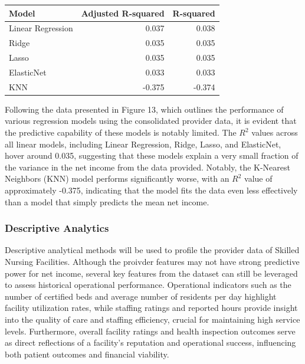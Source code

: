 \documentclass{article}
\theoremstyle{mytheoremstyle}
\theoremstyle{mytheoremstyle}
\theoremstyle{myproblemstyle}
\begin{document}
\begin{table}[ht]
\centering
\begin{tabular}{@{}lrr@{}}
\toprule
Model            & \multicolumn{1}{c}{Adjusted R-squared} & \multicolumn{1}{c}{R-squared} \\ 
\midrule
Linear Regression & 0.037 & 0.038\\
Ridge             & 0.035 & 0.035\\
Lasso             & 0.035 & 0.035\\
ElasticNet        & 0.033 & 0.033\\
KNN               & -0.375 & -0.374\\
\bottomrule
\end{tabular}
\label{tab:model_performance robust}
\end{table}

Following the data presented in Figure 13, which outlines the performance of various regression models using the consolidated provider data, it is evident that the predictive capability of these models is notably limited. The $R^2$ values across all linear models, including Linear Regression, Ridge, Lasso, and ElasticNet, hover around 0.035, suggesting that these models explain a very small fraction of the variance in the net income from the data provided. Notably, the K-Nearest Neighbors (KNN) model performs significantly worse, with an $R^2$ value of approximately -0.375, indicating that the model fits the data even less effectively than a model that simply predicts the mean net income.

\pagebreak
\subsubsection{Descriptive Analytics}
Descriptive analytical methods will be used to profile the provider data of Skilled Nursing Facilities. Although the proivder features may not have strong predictive power for net income, several key features from the dataset can still be leveraged to assess historical operational performance. Operational indicators such as the number of certified beds and average number of residents per day highlight facility utilization rates, while staffing ratings and reported hours provide insight into the quality of care and staffing efficiency, crucial for maintaining high service levels. Furthermore, overall facility ratings and health inspection outcomes serve as direct reflections of a facility's reputation and operational success, influencing both patient outcomes and financial viability.
\end{document}
